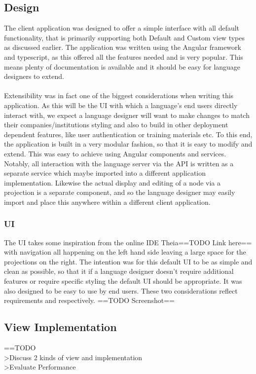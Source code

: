 \documentclass{report}
\begin{document}
\subsection{Design}
The client application was designed to offer a simple interface with all default functionality, that is primarily  supporting both Default and Custom view types as discussed earlier. The application was written using the Angular framework and typescript, as this offered all the features needed and is very popular. This means plenty of documentation is available and it should be easy for language designers to extend.
\\
\\
Extensibility was in fact one of the biggest considerations when writing this application. As this will be the UI with which a language's end users directly interact with, we expect a language designer will want to make changes to match their companies/institutions styling and also to build in other  deployment dependent features, like user authentication or training materials etc. To this end, the application is built in a very modular fashion, so that it is easy to modify and extend. This was easy to achieve using Angular components and services. Notably, all interaction with the language server via the API is written as a separate service which maybe imported into a different application implementation. Likewise the actual display and editing of a node via a projection is a separate component, and so the language designer may easily import and place this anywhere within a different client application.
\subsubsection{UI}
The UI takes some inspiration from the online IDE Theia==TODO Link here== with navigation all happening on the left hand side leaving a large space for the projections on the right. The intention was for this default UI to be as simple and clean as possible, so that it if a language designer doesn't require additional features or require specific styling the default UI should be appropriate. It was also designed to be easy to use by end users. These two considerations reflect requirements \RSetup and \RIntuitive respectively.
==TODO Screenshot==


\subsection{View Implementation}

==TODO 
\\>Discuss 2 kinds of view and implementation
\\>Evaluate Performance



\printbibliography
\end{document}
